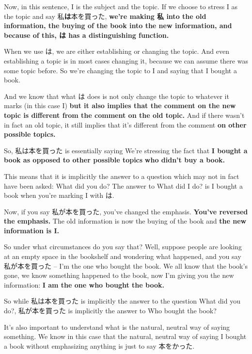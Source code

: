 Now, in this sentence, I is the subject and the topic. If we choose to stress I as the topic and say 私{\bf は}本を買った, {\bf we're making 私 into the old information, the buying of the book into the new information, and because of this, は has a distinguishing function.}

\thinrule

When we use は, we are either establishing or changing the topic.\crlf
And even establishing a topic is in most cases changing it, because we can assume there was some topic before. So we're changing the topic to I and saying that I bought a book.

And we know that what は does is not only change the topic to whatever it marks (in this case I) {\bf but it also implies that the comment on the new topic\crlf
is different from the comment on the old topic.} And if there wasn't in fact an old topic, it still implies that it's different from the comment {\bf on other possible topics.}

So, 私は本を買った is essentially saying  We're stressing the fact that {\bf I bought a book as opposed to other possible topics} {\bf who didn't buy a book.}

This means that it is implicitly the answer to a question which may not in fact have been asked: What did you do? The answer to What did I do? is I bought a book when you're marking I with は.

\thinrule

Now, if you say 私が本を買った, you've changed the emphasis. {\bf You've reversed the emphasis.} The old information is now the buying of the book and {\bf the new information is I.}

So under what circumstances do you say that? Well, suppose people are looking at an empty space in the bookshelf and wondering what happened, and you say 私が本を買った -- I'm the one who bought the book. We all know that the book's gone, we know something happened to the book, now I'm giving you the new information: {\bf I am the one who bought the book.}

So while 私は本を買った is implicitly the answer to the question What did you do?, 私が本を買った is implicitly the answer to Who bought the book?

\thinrule

It's also important to understand what is the natural, neutral way of saying something. We know in this case that the natural, neutral way of saying I bought a book without emphasizing anything is just to say 本をかった.

